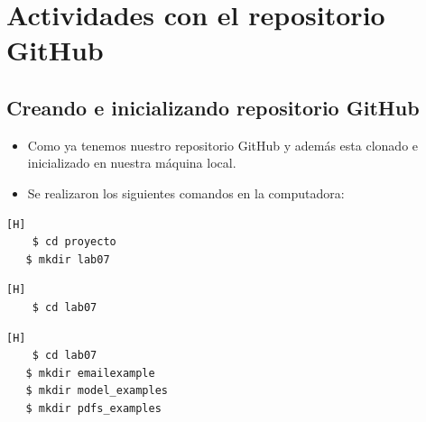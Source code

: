 \section{Actividades con el repositorio GitHub}

\subsection{Creando e inicializando repositorio GitHub}
\begin{itemize}	
	\item Como ya tenemos nuestro repositorio GitHub y además esta clonado e inicializado en nuestra máquina local.
	\item Se realizaron los siguientes comandos en la computadora:
\end{itemize}	

\begin{lstlisting}[language=bash,caption={Creando carpeta de trabajo dentro de nuestro repositorio clonado en mi maquina local}][H]
	$ cd proyecto
   $ mkdir lab07
\end{lstlisting}
\begin{lstlisting}[language=bash,caption={Dirijíéndonos a la carpeta de trabajo}][H]
	$ cd lab07
\end{lstlisting}	
\begin{lstlisting}[language=bash,caption={Creando carpetas que contendrán el proyecto e imagenes}][H]
	$ cd lab07
   $ mkdir emailexample
   $ mkdir model_examples
   $ mkdir pdfs_examples
\end{lstlisting}

